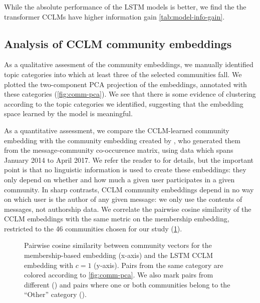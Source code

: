 \documentclass[11pt,a4paper]{article}
\begin{document}
While the absolute performance of the LSTM models is better,
we find the the transformer CCLMs have higher information gain 
\cref{tab:model-info-gain}.

\subsection{Analysis of CCLM community embeddings}

As a qualitative assesment of the community embeddings, 
we manually identified topic categories into which at least three
of the selected communities fall.
We plotted the two-component PCA projection of the embeddings,
annotated with these categories (\cref{fig:comm-pca}).
We see that there is some evidence of clustering according to
the topic categories we identified,
suggesting that the embedding space learned by the model is meaningful.

\begin{figure*}
\caption{Community embedding PCA of the best LSTM (left, $c=1$) and transformer (right, $c=3$) models.}
\label{fig:comm-pca}
\end{figure*}

As a quantitative assessment, we compare the CCLM-learned community
embedding with the community embedding created by \citet{Kumar2018},
who generated them from the message-community co-occurence matrix,
using data which spans January 2014 to April 2017. We refer the reader
to \citet{Kumar2018} %
for details, but the important point is that no linguistic
information is used to create these embeddings: they only depend on
whether and how much a given user participates in a given
community. In sharp contrasts, CCLM community embeddings depend in no
way on which user is the author of any given message: we only use the
contents of messages, not authorship data. 
%
We correlate the pairwise cosine similarity of the
CCLM embeddings with the same metric on the membership embedding,
restricted to the 46 communities chosen for our study
(\cref{fig:pairwise-comm-sim}).

\begin{figure}
  \caption{Pairwise cosine similarity between community vectors for 
    the membership-based embedding (x-axis) and
  the LSTM CCLM embedding with $c=1$ (y-axis). 
  Pairs from the same category are colored according to \cref{fig:comm-pca}.
  We also mark pairs from different (\texttimes) and pairs where one or both
  communities belong to the ``Other'' category (\textbigcircle).
  }
  \label{fig:pairwise-comm-sim}
\end{figure}
\end{document}
